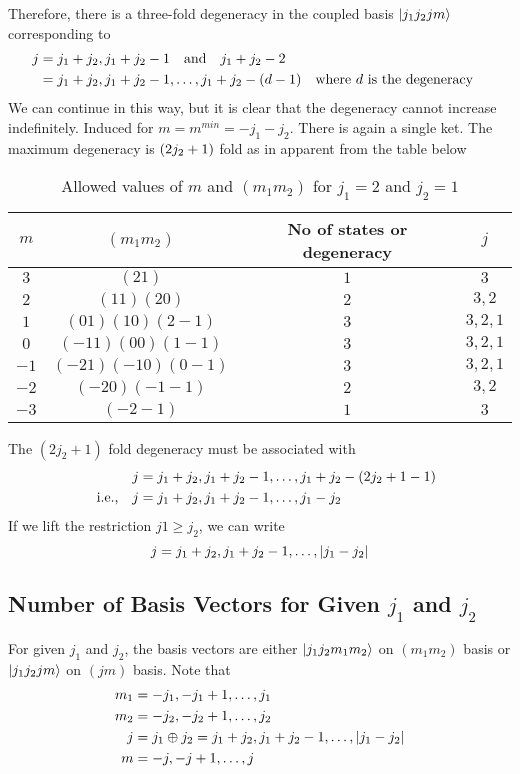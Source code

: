 Therefore, there is a three-fold degeneracy in the coupled basis $\ket{j_1 j_2 j m}$ corresponding to 
\begin{align*}
j &= j_1 + j_2,  j_1+j_2 - 1 \qq{and} j_1 + j_2 - 2 \\
&=  j_1 + j_2,  j_1+j_2 - 1, \ldots, j_1+j_2 - (d - 1) \qq{where $d$ is the degeneracy}
\end{align*}
We can continue in this way, but it is clear that the degeneracy cannot increase indefinitely. Induced for $m=m^{min} = -j_1 - j_2$. There is again a single ket. The maximum degeneracy is $\qty(2 j _2 + 1)$ fold as in apparent from the table below

\begin{table}
	\centering
	\begin{tabular}{c|c|c|c}
		$m$ & $(m_1 m_2)$ & No of states or degeneracy & $j$ \\
		\hline
		$3$ & $(21)$ & $1$ & $3$ \\
		$2$ & $(11)(20)$ & $2$ & $3,2$ \\
		$1$ & $(01)(10)(2-1)$ & $3$ & $3,2,1$ \\
		$0$ & $(-1 1)(0 0) (1 -1)$ & $3$ & $3,2,1$ \\
		$-1$ & $(-2 1)(-1 0)(0 -1)$ & $3$ & $3,2,1$ \\
		$-2$ & $(-2 0)(-1 -1)$ & $2$ & $3,2$ \\
		$-3$ & $(-2-1)$ & $1$ & $3$
	\end{tabular}
\caption{Allowed values of $m$ and $(m_1 m_2)$ for $j_1=2$ and $j_2=1$}
\end{table}

The $(2 j_2 + 1)$ fold degeneracy must be associated with 
\begin{align*}
j&=j_1 + j_2, j_1 + j_2 - 1, \ldots, j_1 + j_2 - (2 j_2 + 1 - 1) \\
\qq{i.e.,} j&= j_1 + j_2, j_1 + j_2 - 1, \ldots, j_1-j_2
\end{align*}
If we lift the restriction $j1 \geq j_2$, we can write
\begin{equation}
\label{chapter19-eqn9}
j = j_1 + j_2, j_1 + j_2 - 1, \ldots, \abs{j_1-j_2}
\end{equation}


\subsection{Number of Basis Vectors for Given $j_1$ and $j_2$}
For given $j_1$ and $j_2$, the basis vectors are either $\ket{j_1 j_2 m_1 m_2}$ on $(m_1 m_2)$ basis or $\ket{j_1 j_2 j m}$ on $(j m)$ basis. Note that
\begin{align*}
m_1 &= -j_1, -j_1 + 1, \ldots, j_1\\
m_2 &= -j_2, -j_2 + 1, \ldots, j_2\\
j &= j_1 \oplus j_2 = j_1 + j_2, j_1 + j_2 - 1, \ldots, \abs{j_1 - j_2}\\
m &= -j, -j + 1, \ldots, j
\end{align*} 

